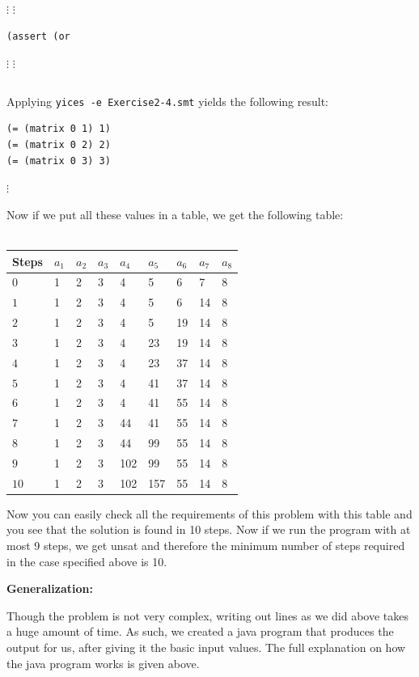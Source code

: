 \documentclass[12pt]{article}
\begin{document}
{\footnotesize
\begin{verbatim}

\end{verbatim}
$\vdots$
$\vdots$
\begin{verbatim}
(assert (or
\end{verbatim}
$\vdots$
$\vdots$
\begin{verbatim}

\end{verbatim}
}

\noindent Applying {\tt yices -e Exercise2-4.smt} yields the following result:

{\footnotesize
\begin{verbatim}
(= (matrix 0 1) 1)
(= (matrix 0 2) 2)
(= (matrix 0 3) 3)
\end{verbatim}
$\vdots$
}

\noindent Now if we put all these values in a table, we get the following table:\\
\\
\begin{tabular}{| l | l | l | l | l | l | l | l | l |}
\hline
Steps	& $a_1$	& $a_2$	& $a_3$ & $a_4$ & $a_5$	& $a_6$	& $a_7$ & $a_8$\\
\hline
$0$	& 1	&	2	&	3 & 4	&	5	&	6 & 7 & 8\\
$1$	& 1	&	2	&	3 & 4	&	5	&	6 & 14 & 8\\
$2$	& 1	&	2	&	3 & 4	&	5	&	19 & 14 & 8\\
$3$	& 1	&	2	&	3 & 4	&	23	&	19& 14 & 8\\
$4$	& 1	&	2	&	3 & 4	&	23	&	37 & 14 & 8\\
$5$	& 1	&	2	&	3 & 4	&	41	&	37 & 14 & 8\\
$6$	& 1	&	2	&	3 & 4	&	41	&	55 & 14 & 8\\
$7$	& 1	&	2	&	3 & 44	&	41	&	55 & 14 & 8\\
$8$	& 1	&	2	&	3 & 44	&	99	&	55 & 14 & 8\\
$9$	& 1	&	2	&	3 & 102	&	99	&	55 & 14 & 8\\
$10$	& 1	&	2	&	3 & 102	&	157	&	55 & 14 & 8\\
\hline
\end{tabular}

\vspace{3mm}

Now you can easily check all the requirements of this problem with this table and you see that the solution is found in 10 steps. Now if we run the program with at most 9 steps, we get unsat and therefore the minimum number of steps required in the case specified above is 10.

\vspace{3mm}

{\bf Generalization:}

Though the problem is not very complex, writing out lines as we did above takes a huge amount of time. As such, we created a java program that produces the output for us, after giving it the basic input values. The full explanation on how the java program works is given above.\\

\vspace{3mm}
\end{document}
